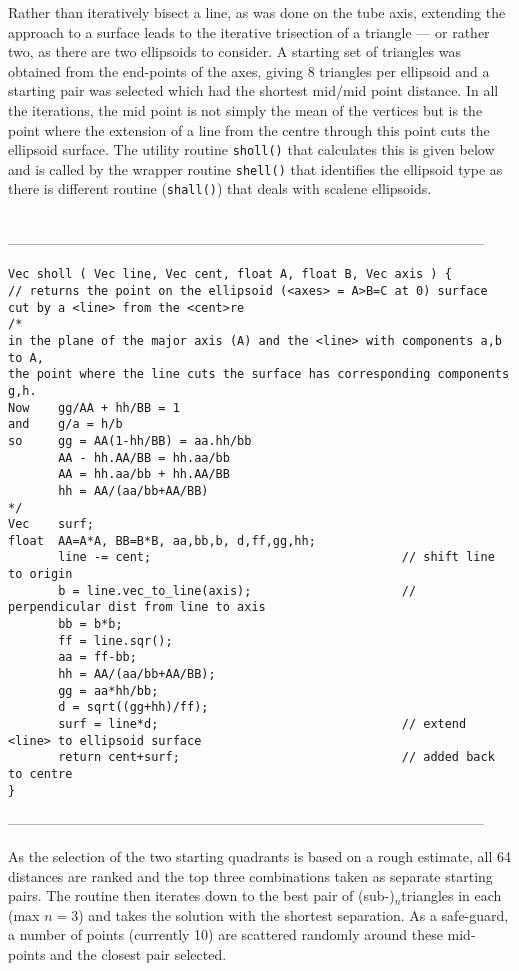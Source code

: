 {{{{{Rather than iteratively bisect a line, as was done on the tube axis, extending the approach
to a surface leads to the iterative trisection of a triangle --- or rather two, as there
are two ellipsoids to consider.  A starting set of triangles was obtained from the end-points 
of the axes, giving 8 triangles per ellipsoid and a starting pair was selected which had the
shortest mid/mid point distance.  In all the iterations, the mid point is not simply the mean
of the vertices but is the point where the extension of a line from the centre through this point
cuts the ellipsoid surface.  The utility routine {\tt sholl()} that calculates this is given
below and is called by the wrapper routine {\tt shell()} that identifies the ellipsoid type
as there is different routine ({\tt shall()}) that deals with scalene ellipsoids.
\begin{singlespace}
\ \\
------------------------------------------------------------------------------------------------------
\begin{tiny}
\begin{verbatim}
Vec sholl ( Vec line, Vec cent, float A, float B, Vec axis ) {
// returns the point on the ellipsoid (<axes> = A>B=C at 0) surface cut by a <line> from the <cent>re
/*
in the plane of the major axis (A) and the <line> with components a,b to A,
the point where the line cuts the surface has corresponding components g,h.
Now    gg/AA + hh/BB = 1
and    g/a = h/b
so     gg = AA(1-hh/BB) = aa.hh/bb
       AA - hh.AA/BB = hh.aa/bb
       AA = hh.aa/bb + hh.AA/BB
       hh = AA/(aa/bb+AA/BB)
*/
Vec    surf;
float  AA=A*A, BB=B*B, aa,bb,b, d,ff,gg,hh;
       line -= cent;                                   // shift line to origin
       b = line.vec_to_line(axis);                     // perpendicular dist from line to axis
       bb = b*b;
       ff = line.sqr();
       aa = ff-bb;
       hh = AA/(aa/bb+AA/BB);
       gg = aa*hh/bb;
       d = sqrt((gg+hh)/ff);
       surf = line*d;                                  // extend <line> to ellipsoid surface
       return cent+surf;                               // added back to centre
}
\end{verbatim}
\end{tiny}
------------------------------------------------------------------------------------------------------
\end{singlespace}

As the selection of the two starting quadrants is based on a rough estimate, all 64 distances are ranked
and the top three combinations taken as separate starting pairs.   The routine then iterates down to the
best pair of (sub-)$_n$triangles in each (max $n=3$) and takes the solution with the shortest separation.
As a safe-guard, a number of points (currently 10) are scattered randomly around these mid-points and
the closest pair selected.  

}}}}}
